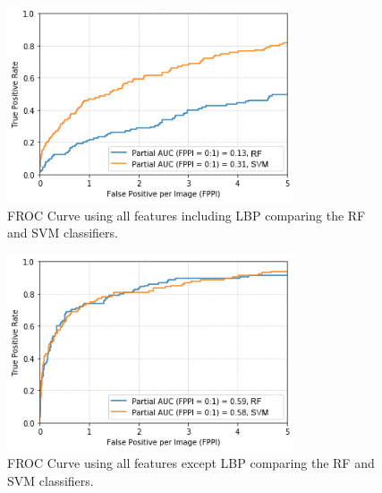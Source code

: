 \begin{figure}[htb]
\caption{FROC Curve using all features including LBP comparing the RF and SVM classifiers.}
\begin{minipage}[b]{1.0\linewidth}
  \centering
  \centerline{\includegraphics[width=8.5cm]{rf_svm_roc_lbp.png}}
\end{minipage}
  \label{fig:res_lbp}
\end{figure}
    
\begin{figure}[htb]
\caption{FROC Curve using all features except LBP comparing the RF and SVM classifiers.}
\begin{minipage}[b]{1.0\linewidth}
  \centering
  \centerline{\includegraphics[width=8.5cm]{rf_svm_roc.png}}
\end{minipage}
 \label{fig:res_no_lbp}
\end{figure}
